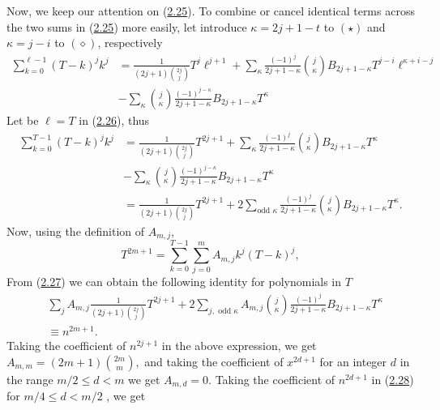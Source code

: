 \documentclass[11pt, letterpaper]{amsart} da da ya qq
\theoremstyle{definition}
\theoremstyle{remark}
\numberwithin{equation}{section}
\begin{document}
Now, we keep our attention on (\hyperref[gen_6_1]{2.25}).
To combine or cancel identical terms across the two sums in (\hyperref[gen_6_1]{2.25}) more easily, let introduce $\kappa=2j+1-t$ to $(\star)$ and $\kappa=j-i$ to $(\diamond)$, respectively
\begin{equation}\label{gen_7}
\begin{split}
\sum_{k=0}^{\ell-1} (T-k)^j k^j
&=\frac{1}{(2j+1)\binom{2j}j} T^{j}\ell^{j+1}
+\sum_{\kappa} \frac{(-1)^j}{2j+1-\kappa}\binom{j}{\kappa}B_{2j+1-\kappa}T^{j-i}\ell^{\kappa+i-j} \\
&-\sum_{\kappa} \binom{j}{\kappa} \frac{(-1)^{j-\kappa}}{2j+1-\kappa} B_{2j+1-\kappa}T^{\kappa}
\end{split}
\end{equation}
Let be $\ell=T$ in (\hyperref[gen_7]{2.26}), thus
\begin{equation}\label{gen_7_1}
\begin{split}
\sum_{k=0}^{T-1} (T-k)^j k^j
&=\frac{1}{(2j+1)\binom{2j}j} T^{2j+1}
+\sum_{\kappa} \frac{(-1)^j}{2j+1-\kappa}\binom{j}{\kappa}B_{2j+1-\kappa}T^{\kappa} \\
&-\sum_{\kappa} \binom{j}{\kappa} \frac{(-1)^{j-\kappa}}{2j+1-\kappa} B_{2j+1-\kappa}T^{\kappa}\\
&=\frac{1}{(2j+1)\binom{2j}j} T^{2j+1} + 2\sum_{\text{odd }\kappa}
\frac{(-1)^j}{2j+1-\kappa}\binom{j}{\kappa}B_{2j+1-\kappa}T^{\kappa}.
\end{split}
\end{equation}
Now, using the definition of $A_{m,j}$,
\begin{equation*}
T^{2m+1}=\sum_{k=0}^{T-1}\sum_{j=0}^{m} A_{m,j}k^j(T-k)^j,
\end{equation*}
From (\hyperref[gen_7_1]{2.27}) we can obtain the following identity for polynomials in $T$
\begin{equation}\label{gen_8}
\begin{split}
&\sum_{j}A_{m,j}\frac{1}{(2j+1)\binom{2j}j}T^{2j+1}
+ 2\sum_{j, \text{ odd }\kappa} A_{m,j} \binom{j}{\kappa} \frac{(-1)^j}{2j+1-\kappa} B_{2j+1-\kappa}T^{\kappa}\\
&\equiv n^{2m+1}.
\end{split}
\end{equation}
Taking the coefficient of $n^{2j+1}$ in the above expression, we get $A_{m,m} = (2m+1) \binom{2m}{m},$ and taking the
coefficient of $x^{2d+1}$ for an integer $d$ in the range $m/2 \leq d < m$ we get $A_{m,d}=0$.
Taking the coefficient of $n^{2d+1}$ in (\hyperref[gen_8]{2.28}) for $m/4 \leq d < m/2$ , we get
\end{document}
